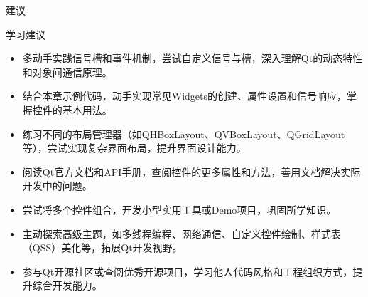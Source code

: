 \documentclass[UTF8,aspectratio=169]{beamer}
\begin{document}
\begin{frame}{建议}
    \begin{ytublock}{学习建议}
        \begin{itemize}
            \item 多动手实践信号槽和事件机制，尝试自定义信号与槽，深入理解Qt的动态特性和对象间通信原理。
            \item 结合本章示例代码，动手实现常见Widgets的创建、属性设置和信号响应，掌握控件的基本用法。
            \item 练习不同的布局管理器（如QHBoxLayout、QVBoxLayout、QGridLayout等），尝试实现复杂界面布局，提升界面设计能力。
            \item 阅读Qt官方文档和API手册，查阅控件的更多属性和方法，善用文档解决实际开发中的问题。
            \item 尝试将多个控件组合，开发小型实用工具或Demo项目，巩固所学知识。
            \item 主动探索高级主题，如多线程编程、网络通信、自定义控件绘制、样式表（QSS）美化等，拓展Qt开发视野。
            \item 参与Qt开源社区或查阅优秀开源项目，学习他人代码风格和工程组织方式，提升综合开发能力。
        \end{itemize}
    \end{ytublock}
\end{frame}
\end{document}
